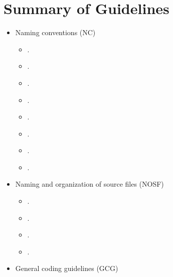 %
\section{Summary of Guidelines}
\label{sec:summary_guidelines}
%

\begin{itemize}

\item Naming conventions (NC)

  \setcounter{Thyra_NC_counter}{0}

  \begin{itemize}
  {}\item\NCClassNames.
  {}\item\NCNamespaceNames.
  {}\item\NCEnumNames.
  {}\item\NCObjectNames.
  {}\item\NCDataMemberNames.
  {}\item\NCFunctionNames.
  {}\item\NCBaseDefaultClassNames.
  {}\item\NCConstNonconstAccessFunctionName.
  \end{itemize}

\item Naming and organization of source files (NOSF)

  \setcounter{Thyra_NOSF_counter}{0}

  \begin{itemize}
  {}\item\NOSFFileExtension.
  {}\item\NOSFClassFiles.
  {}\item\NOSFIncludeGuards.
  {}\item\NOSFTemplateFiles.
  \end{itemize}

\item General coding guidelines (GCG)

  \setcounter{Thyra_GCG_counter}{0}


\end{itemize}

